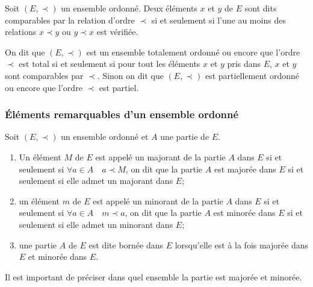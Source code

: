 \begin{defdef}
    Soit \((E, \prec)\) un ensemble ordonné. Deux éléments \(x\) et \(y\) de 
    \(E\) sont dits comparables par la relation d'ordre \(\prec\) si et 
    seulement si l'une au moins des relations \(x \prec y\) ou \(y \prec x\) est 
    vérifiée.
\end{defdef}

\begin{defdef}
    On dit que \((E, \prec)\) est un ensemble totalement ordonné ou encore que 
    l'ordre \(\prec\) est total si et seulement si pour tout les éléments \(x\) 
    et \(y\) pris dans \(E\), \(x\) et \(y\) sont comparables par \(\prec\). 
    Sinon on dit que \((E,\prec)\) est partiellement ordonné ou encore que 
    l'ordre \(\prec\) est partiel.
\end{defdef}

\subsubsection{Éléments remarquables d'un ensemble ordonné}
\label{chap3-subsubsec:elementremarquables}

Soit \((E,\prec)\) un ensemble ordonné et \(A\) une partie de \(E\).
\begin{defdef}
    \begin{enumerate}
        \item Un élément \(M\) de \(E\) est appelé un majorant de la partie 
            \(A\) dans \(E\) si et seulement si \(\forall a \in A \quad a \prec 
            M\), on dit que la partie \(A\) est majorée dans \(E\) si et 
            seulement si elle admet un majorant dans \(E\);
        \item un élément \(m\) de \(E\) est appelé un minorant de la partie 
            \(A\) dans \(E\) si et seulement si \(\forall a \in A \quad m \prec 
            a\), on dit que la partie \(A\) est minorée dans \(E\) si et 
            seulement si elle admet un minorant dans \(E\);
        \item une partie \(A\) de \(E\) est dite bornée dans \(E\) lorsqu'elle 
            est à la fois majorée dans \(E\) et minorée dans \(E\).
    \end{enumerate}
    Il est important de préciser dans quel ensemble la partie est majorée et 
    minorée.
\end{defdef}

